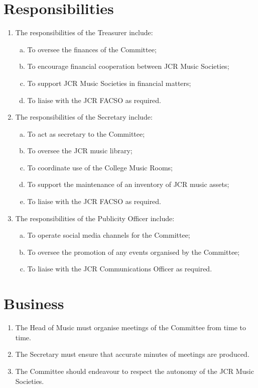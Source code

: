 \documentclass[12pt]{article}
\begin{document}
\section{Responsibilities}
\begin{enumerate}
    \item The responsibilities of the Treasurer include:
    \begin{enumerate}[(a)]
        \item To oversee the finances of the Committee;
        \item To encourage financial cooperation between JCR Music Societies;
        \item To support JCR Music Societies in financial matters;
        \item To liaise with the JCR FACSO as required.
    \end{enumerate}
    \item The responsibilities of the Secretary include:
    \begin{enumerate}[(a)]
        \item To act as secretary to the Committee;
        \item To oversee the JCR music library;
        \item To coordinate use of the College Music Rooms;
        \item To support the maintenance of an inventory of JCR music assets;
        \item To liaise with the JCR FACSO as required.
    \end{enumerate}
    \item The responsibilities of the Publicity Officer include:
    \begin{enumerate}[(a)]
        \item To operate social media channels for the Committee;
        \item To oversee the promotion of any events organised by the Committee;
        \item To liaise with the JCR Communications Officer as required.
    \end{enumerate}
\end{enumerate}
\section{Business}
\begin{enumerate}
    \item The Head of Music must organise meetings of the Committee from time to time.
    \item The Secretary must ensure that accurate minutes of meetings are produced.
    \item The Committee should endeavour to respect the autonomy of the JCR Music Societies.
\end{enumerate}
\end{document}
